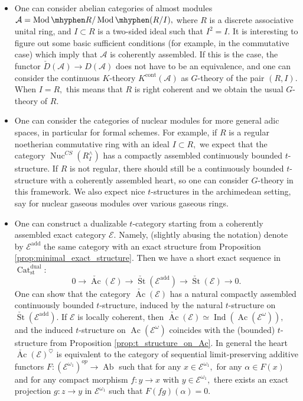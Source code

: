 \documentclass[11pt,leqno]{amsart}
\numberwithin{equation}{section}
\newcommand{\hy}{\mhyphen}
\newcommand{\Nuc}{\operatorname{Nuc}}
\newcommand{\Cat}{\operatorname{Cat}}
\newcommand{\cont}{\operatorname{cont}}
\newcommand{\St}{\operatorname{St}}
\newcommand{\st}{\operatorname{st}}
\newcommand{\dual}{\operatorname{dual}}
\newcommand{\cA}{{\mathcal A}}
\newcommand{\cE}{{\mathcal E}}
\newcommand{\Ab}{\operatorname{Ab}}
\newcommand{\add}{\operatorname{add}}
\newcommand{\Ind}{\operatorname{Ind}}
\newcommand{\Ac}{\operatorname{Ac}}
\newcommand{\Mod}{\operatorname{Mod}}
\begin{document}
\begin{itemize}
	\item One can consider abelian categories of almost modules $\cA=\Mod\hy R/\Mod\hy (R/I),$ where $R$ is a discrete associative unital ring, and $I\subset R$ is a two-sided ideal such that $I^2 = I.$ It is interesting to figure out some basic sufficient conditions (for example, in the commutative case) which imply that $\cA$ is coherently assembled. If this is the case, the functor $\check{D}(\cA)\to D(\cA)$ does not have to be an equivalence, and one can consider the continuous $K$-theory $K^{\cont}(\cA)$ as $G$-theory of the pair $(R,I).$ When $I=R,$ this means that $R$ is right coherent and we obtain the usual $G$-theory of $R.$
	
	\item One can consider the categories of nuclear modules for more general adic spaces, in particular for formal schemes. For example, if $R$ is a regular noetherian commutative ring with an ideal $I\subset R,$ we expect that the category $\Nuc^{CS}(R^{\wedge}_I)$ has a compactly assembled continuously bounded $t$-structure. If $R$ is not regular, there should still be a continuously bounded $t$-structure with a coherently assembled heart, so one can consider $G$-theory in this framework. We also expect nice $t$-structures in the archimedean setting, say for nuclear gaseous modules over various gaseous rings.
	
    \item One can construct a dualizable $t$-category starting from a coherently assembled exact category $\cE.$ Namely, (slightly abusing the notation) denote by $\cE^{\add}$ the same category with an exact structure from Proposition \ref{prop:minimal_exact_structure}. Then we have a short exact sequence in $\Cat_{\st}^{\dual}:$
    \begin{equation*}\label{eq:ses_check_Ac_of_E}
    	0\to \check{\Ac}(\cE)\to\check{\St}(\cE^{\add})\to\check{\St}(\cE)\to 0.
    \end{equation*}
    One can show that the category $\check{\Ac}(\cE)$ has a natural compactly assembled continuously bounded $t$-structure, induced by the natural $t$-structure on $\check{\St}(\cE^{\add}).$ If $\cE$ is locally coherent, then $\check{\Ac}(\cE)\simeq\Ind(\Ac(\cE^{\omega})),$ and the induced $t$-structure on $\Ac(\cE^{\omega})$ coincides with the (bounded) $t$-structure from Proposition \ref{prop:t_structure_on_Ac}. In general the heart $\check{\Ac}(\cE)^{\heartsuit}$ is equivalent to the category of sequential limit-preserving additive functors $F:(\cE^{\omega_1})^{op}\to\Ab$ such that for any $x\in\cE^{\omega_1},$ for any $\alpha\in F(x)$ and for any compact morphism $f:y\to x$ with $y\in\cE^{\omega_1},$ there exists an exact projection $g:z\to y$ in $\cE^{\omega_1}$ such that $F(fg)(\alpha)=0.$
    

\end{itemize}
\end{document}
